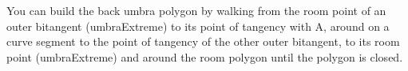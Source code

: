 \documentclass[9pt,twocolumn]{article}
\begin{document}
You can build the back umbra polygon by walking from the room
point of an outer bitangent (umbraExtreme) to its point of tangency with A,
around on a curve segment to the point of tangency of the other outer bitangent,
to its room point (umbraExtreme) and around the room polygon until the polygon
is closed.


\fi

\end{document}
